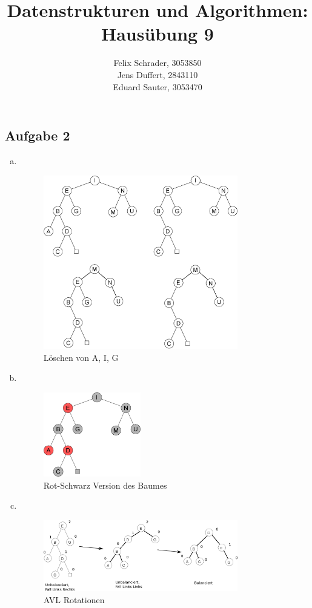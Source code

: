 \documentclass[11pt]{article}
\author{
  Felix Schrader, 3053850 \\ 
  Jens Duffert, 2843110 \\
  Eduard Sauter, 3053470
}
\title{Datenstrukturen und Algorithmen: Haus\"ubung 9}
\begin{document}
\maketitle
\subsection*{Aufgabe 2}
\begin{enumerate}[a)]
  \item $ $
    \begin{figure}[h!]
      \centering
      \includegraphics[width=0.8\textwidth]{avl_search_tree_delete}
      \caption{Löschen von A, I, G}
    \end{figure}
    
  \item $ $

    \begin{figure}[h!]
      \centering
      \includegraphics[width=0.4\textwidth]{avl_search_tree_red_black}
      \caption{Rot-Schwarz Version des Baumes}
    \end{figure}
    
  \item $ $

    \begin{figure}[h!]
      \centering
      \includegraphics[width=0.8\textwidth]{avl_search_tree_rotate}
      \caption{AVL Rotationen}
    \end{figure}
    
\end{enumerate} 
\end{document}
